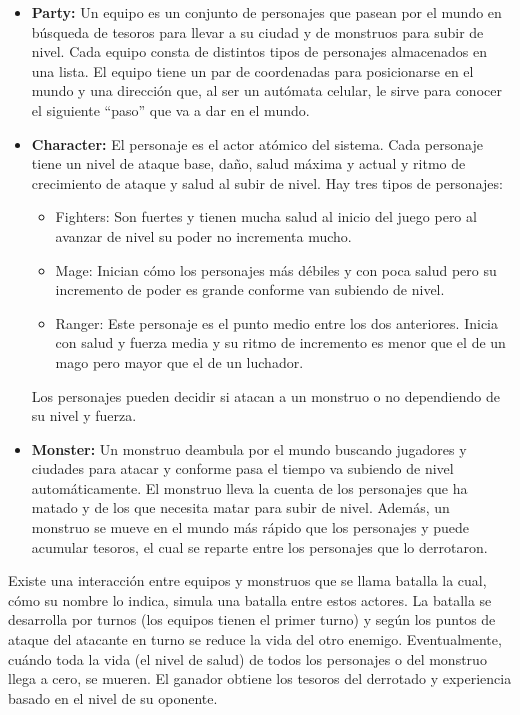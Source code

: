 {{\begin{itemize}
{            cuándo salen a buscar tesoros.
        }
        \item{\textbf{Party: }Un equipo es un conjunto de personajes que pasean
            por el mundo en búsqueda de tesoros para llevar a su ciudad y de
            monstruos para subir de nivel. Cada equipo consta de distintos
            tipos de personajes almacenados en una lista. El equipo tiene un par
            de coordenadas para posicionarse en el mundo y una dirección que, al
            ser un autómata celular, le sirve para conocer el siguiente ``paso''
            que va a dar en el mundo.
        }
        \item{\textbf{Character: }El personaje es el actor atómico del sistema.
            Cada personaje tiene un nivel de ataque base, daño, salud máxima y
            actual y ritmo de crecimiento de ataque y salud al subir de nivel.
            Hay tres tipos de personajes:
            \begin{itemize}
            \item{Fighters: Son fuertes y tienen mucha salud al inicio del
                juego pero al avanzar de nivel su poder no incrementa mucho.
            }
            \item{Mage: Inician cómo los personajes más débiles y con poca
                salud pero su incremento de poder es grande conforme van
                subiendo de nivel.
            }
            \item{Ranger: Este personaje es el punto medio entre los dos
                anteriores. Inicia con salud y fuerza media y su ritmo de
                incremento es menor que el de un mago pero mayor que el de un
                luchador.
            }
            \end{itemize}
            Los personajes pueden decidir si atacan a un monstruo o no
            dependiendo de su nivel y fuerza.
        }
        \item{\textbf{Monster: }Un monstruo deambula por el mundo buscando
            jugadores y ciudades para atacar y conforme pasa el tiempo va
            subiendo de nivel automáticamente. El monstruo lleva la cuenta de
            los personajes que ha matado y de los que necesita matar para subir
            de nivel. Además, un monstruo se mueve en el mundo más rápido que
            los personajes y puede acumular tesoros, el cual se reparte entre
            los personajes que lo derrotaron.
        }
        \end{itemize}
        Existe una interacción entre equipos y monstruos que se llama batalla la
        cual, cómo su nombre lo indica, simula una batalla entre estos actores.
        La batalla se desarrolla por turnos (los equipos tienen el primer turno)
        y según los puntos de ataque del atacante en turno se reduce la vida del
        otro enemigo. Eventualmente, cuándo toda la vida (el nivel de salud) de
        todos los personajes o del monstruo llega a cero, se mueren. El ganador
        obtiene los tesoros del derrotado y experiencia basado en el nivel de su
        oponente.\\

}}
